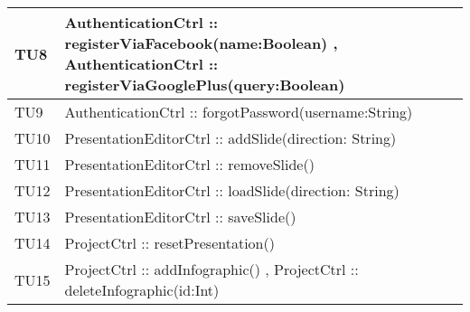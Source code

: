 \begin{table}[H]
\begin{center}
\begin{tabular}{|l|p{}|p{}|c|}

	\toprule
		TU8 & AuthenticationCtrl :: registerViaFacebook(name:Boolean) , AuthenticationCtrl :: registerViaGooglePlus(query:Boolean) \\
	\midrule
		TU9 & AuthenticationCtrl :: forgotPassword(username:String) \\
	\midrule
		TU10 & PresentationEditorCtrl :: addSlide(direction: String) \\
	\midrule
		TU11 & PresentationEditorCtrl :: removeSlide() \\
	\midrule
		TU12 & PresentationEditorCtrl :: loadSlide(direction: String) \\
	\midrule
		TU13 & PresentationEditorCtrl :: saveSlide() \\
	\midrule
		TU14 & ProjectCtrl :: resetPresentation() \\
	\midrule
		TU15 & ProjectCtrl :: addInfographic() , ProjectCtrl :: deleteInfographic(id:Int) \\
			\bottomrule
\end{tabular}
\end{center}
\end{table}
